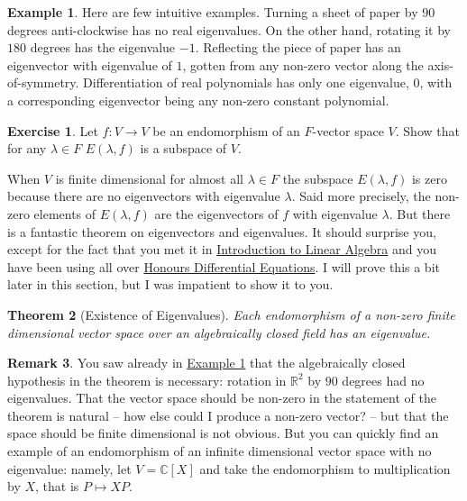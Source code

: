\documentclass[11pt]{amsbook}
\newtheorem{theorem}{Theorem}[section]
\theoremstyle{definition}
\newtheorem{rem}[theorem]{Remark}
\newtheorem{ex}[theorem]{Example}
\newtheorem{exercise}{Exercise}
\begin{document}
\begin{ex}\label{intuitexev} Here are few intuitive examples. Turning a sheet of paper by $90$ degrees anti-clockwise has no real eigenvalues. On the other hand, rotating it by $180$ degrees has the eigenvalue $-1$. Reflecting the piece of paper has an eigenvector with eigenvalue of $1$, gotten from any non-zero vector along the axis-of-symmetry. Differentiation of real polynomials has only one eigenvalue, $0$, with a corresponding eigenvector being any non-zero constant polynomial.
\end{ex}

\begin{exercise}
Let $f: V\to V$ be an endomorphism of an $F$-vector space $V$. Show that for any $\lambda \in F$
$E(\lambda ,f)$  is a subspace of $V$.
\end{exercise}

When $V$ is finite dimensional for almost all $\lambda \in F$ the subspace $E(\lambda, f)$ is zero because there are no eigenvectors with eigenvalue $\lambda$. Said more precisely, the non-zero elements of $E(\lambda,f)$ are the eigenvectors of $f$ with eigenvalue $\lambda$. But there is a fantastic theorem on eigenvectors and eigenvalues. It should surprise you, except for the fact that you met it in \href{http://www.drps.ed.ac.uk/14-15/dpt/cxmath08057.htm}{Introduction to Linear Algebra} and you have been using all over \href{http://www.drps.ed.ac.uk/14-15/dpt/cxmath10066.htm}{Honours Differential Equations}. I will prove this a bit later in this section, but I was impatient to show it to you.

\begin{theorem} [Existence of Eigenvalues] \label{evalsexist} Each endomorphism of a non-zero finite dimensional vector space over an algebraically closed field has an eigenvalue.
\end{theorem}

\begin{rem}
You saw already in \hyperref[intuitexev]{Example \ref{intuitexev}} that the algebraically closed hypothesis in the theorem is necessary: rotation in $\mathbb{R}^2$ by $90$ degrees had no eigenvalues. That the vector space should be non-zero in the statement of the theorem is natural -- how else could I produce a non-zero vector? -- but that the space should be finite dimensional is not obvious. But you can quickly find an example of an endomorphism of an infinite dimensional vector space with no eigenvalue: namely, let $V = \mathbb{C}[X]$ and take the endomorphism to multiplication by $X$, that is $P\mapsto XP$.
\end{rem}
\end{document}
